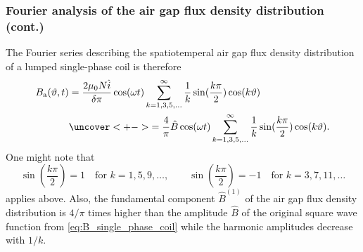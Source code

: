 \begin{frame}
	\frametitle{Fourier analysis of the air gap flux density distribution (cont.)}
    \onslide<+-> The Fourier series describing the spatiotemperal air gap flux density distribution of a lumped single-phase coil is therefore
    \begin{equation}
        \begin{split}
            B_\mathrm{a}(\vartheta, t) &= \frac{2 \mu_0 N \hat{i}}{\delta \pi}\cos(\omega t)\sum_{k=1,3,5,\ldots}^{\infty}   \frac{1}{k}\sin(\frac{k \pi}{2}) \cos(k \vartheta)\\ &\uncover<+->{= \frac{4}{\pi} \hat{B} \cos(\omega t)\sum_{k=1,3,5,\ldots}^{\infty}   \frac{1}{k}\sin(\frac{k \pi}{2}) \cos(k \vartheta).}
            \label{eq:B_single_phase_coil_fourier_series}
        \end{split}
    \end{equation}
    \onslide<+->
    One might note that $$\sin(\frac{k \pi}{2}) = 1 \quad \mbox{for } k=1,5,9,\ldots, \qquad \sin(\frac{k \pi}{2}) = -1 \quad \mbox{for } k=3,7,11,\ldots$$ applies above. \onslide<+-> Also, the fundamental component $\hat{B}^{(1)}$ of the air gap flux density distribution is $4/\pi$ times higher than the amplitude $\hat{B}$ of the original square wave function from \eqref{eq:B_single_phase_coil} while the harmonic amplitudes decrease with $1/k$. 
\end{frame}

